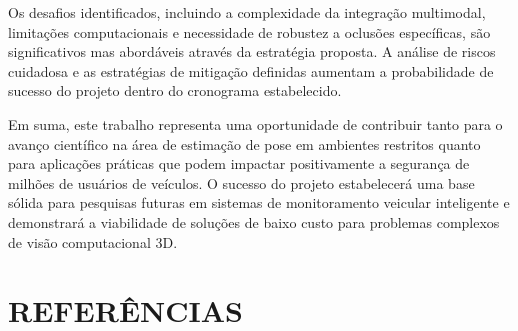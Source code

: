 \documentclass[12pt, a4paper]{article}
\begin{document}
Os desafios identificados, incluindo a complexidade da integração multimodal, limitações computacionais e necessidade de robustez a oclusões específicas, são significativos mas abordáveis através da estratégia proposta. A análise de riscos cuidadosa e as estratégias de mitigação definidas aumentam a probabilidade de sucesso do projeto dentro do cronograma estabelecido.

Em suma, este trabalho representa uma oportunidade de contribuir tanto para o avanço científico na área de estimação de pose em ambientes restritos quanto para aplicações práticas que podem impactar positivamente a segurança de milhões de usuários de veículos. O sucesso do projeto estabelecerá uma base sólida para pesquisas futuras em sistemas de monitoramento veicular inteligente e demonstrará a viabilidade de soluções de baixo custo para problemas complexos de visão computacional 3D.

\section{REFERÊNCIAS}
\end{document}
